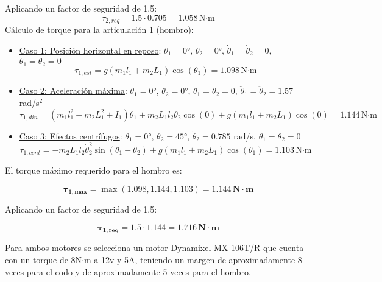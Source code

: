 Aplicando un factor de seguridad de 1.5:
\begin{equation}
\tau_{2,req} = 1.5 \cdot 0.705 = 1.058 \, \text{N·m}
\end{equation}
Cálculo de torque para la articulación 1 (hombro):
\begin{itemize}
    \item \underline{Caso 1: Posición horizontal en reposo}: $\theta_1 = 0°$, $\theta_2 = 0°$, $\dot{\theta}_1 = \dot{\theta}_2 = 0$, $\ddot{\theta}_1 = \ddot{\theta}_2 = 0$ \\
        
        \begin{equation}
        \tau_{1,est} = g(m_1l_1 + m_2L_1)\cos(\theta_1) 
        = 1.098 \, \text{N·m}
        \end{equation}

    \item \underline{Caso 2: Aceleración máxima}: $\theta_1 = 0°$, $\theta_2 = 0°$, $\dot{\theta}_1 = \dot{\theta}_2 = 0$, $\ddot{\theta}_1 = \ddot{\theta}_2 = 1.57$ rad/s$^2$\\
        
        \begin{equation}
        \tau_{1,din} = (m_1l_1^2 + m_2L_1^2 + I_1)\ddot{\theta}_1 + m_2L_1l_2\ddot{\theta}_2\cos(0) + g(m_1l_1 + m_2L_1)\cos(0) = 1.144 \, \text{N·m}
        \end{equation}

    \item \underline{Caso 3: Efectos centrífugos}: $\theta_1 = 0°$, $\theta_2 = 45°$, $\dot{\theta}_2 = 0.785$ rad/s, $\ddot{\theta}_1 = \ddot{\theta}_2 = 0$\\
        
        \begin{equation}
        \tau_{1,cent} = - m_2L_1l_2\dot{\theta}_2^2\sin(\theta_1 - \theta_2) + g(m_1l_1 + m_2L_1)\cos(\theta_1)
        = 1.103 \, \text{N·m}
        \end{equation}
\end{itemize}

El torque máximo requerido para el hombro es:

\begin{equation}
\mathbf{\tau_{1,max}} = \max(1.098, 1.144, 1.103) = \mathbf{1.144 \, N·m }
\end{equation}

Aplicando un factor de seguridad de 1.5:

\begin{equation}
\mathbf{\tau_{1,req}} = 1.5 \cdot 1.144 = \mathbf{1.716 \, N·m }
\end{equation}

Para ambos motores se selecciona un motor Dynamixel MX-106T/R que cuenta con un torque de 8N$\cdot$m a 12v y 5A, teniendo un margen de aproximadamente 8 veces para el codo y de aproximadamente 5 veces para el hombro.
